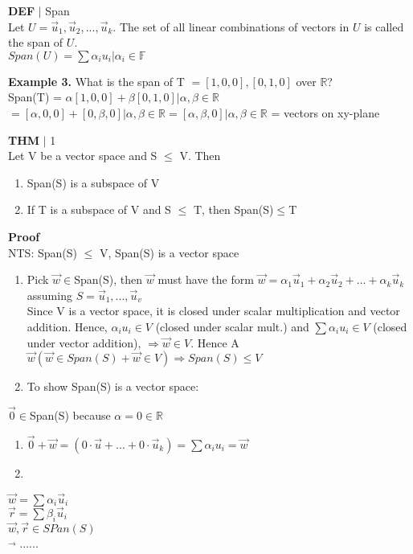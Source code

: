 \documentclass [12pt]{article}
\begin{document}
\begin{framed}
\noindent\textbf{DEF} $|$ Span\\
Let $U = {\overrightarrow{u}_1,\overrightarrow{u}_2,...,\overrightarrow{u}_k}$. The set of all linear combinations of vectors in $U$ is called the span of $U$.\\
$Span(U) = {\sum \alpha_iu_i|\alpha_i\in\mathbb{F}}$
\end{framed}
\noindent\textbf{Example 3.} What is the span of T $={[1,0,0],[0,1,0]}$ over $\mathbb{R}$?\\
Span(T) = ${\alpha[1,0,0]+\beta[0,1,0] | \alpha,\beta\in\mathbb{R}}$\\
$={[\alpha,0,0]+[0,\beta,0] | \alpha,\beta\in\mathbb{R}} = {[\alpha,\beta,0] | \alpha,\beta\in\mathbb{R}}$ = vectors on xy-plane
\begin{framed}
\normalsize\textbf{THM} $|$ 1\\
Let V be a vector space and S $\leq$ V. Then 
\begin{enumerate}[\quad(i)]
    \item Span(S) is a subspace of V
    \item If T is a subspace of V and S $\leq$ T, then Span(S)$\leq$T
\end{enumerate}
\end{framed}
\noindent\textbf{Proof}\\
NTS: Span(S) $\leq$ V, Span(S) is a vector space
\begin{enumerate}
    \item Pick $\overrightarrow{w}\in$Span(S), then $\overrightarrow{w}$ must have the form $\overrightarrow{w} = \alpha_1\overrightarrow{u}_1+\alpha_2\overrightarrow{u}_2+...+\alpha_k\overrightarrow{u}_k$ assuming $S={\overrightarrow{u}_1,...,\overrightarrow{u}_v}$\\
    Since V is a vector space, it is closed under scalar multiplication and vector addition. Hence, $\alpha_iu_i\in V$ (closed under scalar mult.) and $\sum \alpha_iu_i\in V$ (closed under vector addition), $\Rightarrow \overrightarrow{w}\in V$. Hence A$\overrightarrow{w}(\overrightarrow{w}\in Span(S)+\overrightarrow{w}\in V)\Rightarrow Span(S)\leq V$
    \item To show Span(S) is a vector space:
    
\end{enumerate}
$\overrightarrow{0}\in$Span(S) because $\alpha =0\in\mathbb{R}$
\begin{enumerate}
    \item $\overrightarrow{0} +\overrightarrow{w}=(0\cdot \overrightarrow{u}+...+ 0\cdot \overrightarrow{u}_k) = \sum \alpha_iu_i=\overrightarrow{w}$
    \item
\end{enumerate}
$\overrightarrow{w}=\sum \alpha_i\overrightarrow{u}_i $\\
$\overrightarrow{r}=\sum \beta_i\overrightarrow{u}_i$\\
$\overrightarrow{w},\overrightarrow{r}\in SPan(S)$\\
$\overrightarrow{}$
......
\end{document}
